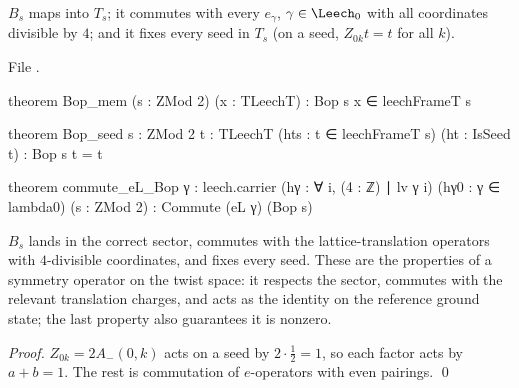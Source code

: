 \begin{proposition}[properties of $B$]\label{ch13:prop:Bop}
$B_s$ maps into $T_s$; it commutes with every $e_\gamma$, $\gamma\in\Leech_0$ with all coordinates divisible by $4$; and
it fixes every seed in $T_s$ (on a seed, $Z_{0k}t=t$ for all $k$).
\end{proposition}
\noindent File .
\begin{leancode}
theorem Bop_mem (s : ZMod 2) (x : TLeechT) : Bop s x ∈ leechFrameT s

theorem Bop_seed {s : ZMod 2} {t : TLeechT} (hts : t ∈ leechFrameT s) (ht : IsSeed t) : Bop s t = t

theorem commute_eL_Bop {γ : leech.carrier} (hγ : ∀ i, (4 : ℤ) ∣ lv γ i) (hγ0 : γ ∈ lambda0) (s : ZMod 2) :
    Commute (eL γ) (Bop s)
\end{leancode}
\begin{physics}
$B_s$ lands in the correct sector, commutes with the lattice-translation operators with $4$-divisible coordinates, and fixes every seed. These are the properties of a symmetry operator on the twist space: it respects the sector, commutes with the relevant translation charges, and acts as the identity on the reference ground state; the last property also guarantees it is nonzero.
\end{physics}
\noindent\emph{Proof.} $Z_{0k}=2A_-(0,k)$ acts on a seed by $2\cdot\tfrac12=1$, so each factor acts by $a+b=1$. The rest
is commutation of $e$-operators with even pairings. \qed

